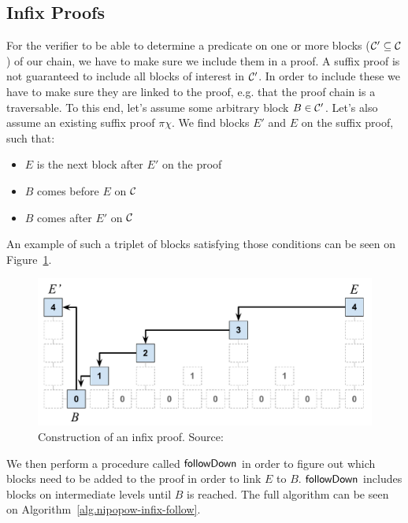 \subsection{Infix Proofs}
For the verifier to be able to determine a predicate on one or more blocks ($\mathcal{C}' \subseteq \mathcal{C}$) of our chain, we have to make sure we include them in a proof. A suffix proof is not guaranteed to include all blocks of interest in $\mathcal{C}'$. In order to include these we have to make sure they are linked to the proof, e.g. that the proof chain is a traversable. To this end, let's assume some arbitrary block $B \in \mathcal{C}'$. Let's also assume an existing suffix proof $\pi\chi$. We find blocks $E'$ and $E$ on the suffix proof, such that:

\begin{itemize}
  \item $E$ is the next block after $E'$ on the proof
  \item $B$ comes before $E$ on $\mathcal{C}$
  \item $B$ comes after $E'$ on $\mathcal{C}$
\end{itemize}

An example of such a triplet of blocks satisfying those conditions can be seen on Figure~\ref{fig:infix-proof}.

\begin{figure}
  \centering
  \includegraphics[width=0.9\columnwidth,keepaspectratio]{figures/infix.pdf}
  \caption{Construction of an infix proof.  Source:~\cite{nipopows}}
  \label{fig:infix-proof}
\end{figure}

We then perform a procedure called $\sf followDown$ in order to figure out which blocks need to be added to the proof in order to link $E$ to $B$. $\sf followDown$ includes blocks on intermediate levels until $B$ is reached. The full algorithm can be seen on Algorithm~\ref{alg.nipopow-infix-follow}.



